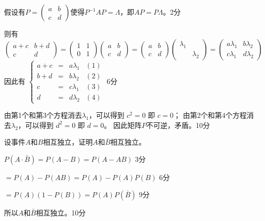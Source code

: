 \begin{solution}
假设有$P = \left(\begin{array}{cc}
  a & b\\
  c & d
\end{array}\right)$使得$P^{-1}AP = \Lambda$，即$AP=P\Lambda$。\dotfill 2分\par
则有 $$\left(\begin{array}{cc}
  a + c & b + d\\
  c & d
\end{array}\right) = \left(\begin{array}{cc}
  1 & 1\\
  0 & 1
\end{array}\right) \left(\begin{array}{cc}
  a & b\\
  c & d
\end{array}\right) = \left(\begin{array}{cc}
  a & b\\
  c & d
\end{array}\right) \left(\begin{array}{cc}
  \lambda_1 & \\
  & \lambda_2
\end{array}\right) = \left(\begin{array}{cc}
  a \lambda_1 & b \lambda_2\\
  c \lambda_1 & d \lambda_2
\end{array}\right)$$ 因此有 $\left\{ \begin{array}{llll}
  a + c & = & a \lambda_1 & (1)\\
  b + d & = & b \lambda_2 & (2)\\
  c & = & c \lambda_1 & (3)\\
  d & = & d \lambda_2 & (4)
\end{array} \right.$ \dotfill 6分\par
由第1个和第3个方程消去$\lambda_1$，可以得到 $c^2 = 0$ 即 $c=0$；
由第2个和第4个方程消去$\lambda_2$，可以得到 $d^2 = 0$ 即 $d=0$。
因此矩阵$P$不可逆，矛盾。\dotfill 10分
\end{solution}


\begin{question}
设事件$A$和$B$相互独立，证明$A$和$\bar{B}$相互独立。
\end{question}

\begin{solution}
$P (A \cdot \bar{B}) = P (A - B) = P (A - A B)$ \dotfill 3分 \par
\qquad $= P (A) - P (A B) = P (A) - P (A) P (B)$ \dotfill 6分 \par
\qquad $= P (A) (1 - P (B)) = P (A) P (\bar{B})$ \dotfill 9分 \par
所以$A$和$\bar{B}$相互独立。\dotfill 10分
\end{solution}
